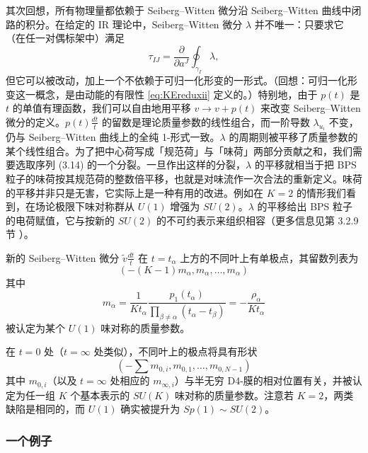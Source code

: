 其次回想，所有物理量都依赖于 Seiberg–Witten 微分沿 Seiberg–Witten 曲线中闭路的积分。在给定的 IR 理论中，Seiberg–Witten 微分 $\lambda$ 并不唯一：只要求它（在任一对偶标架中）满足
\begin{equation}
\label{eq:tau-from-period}
\tau_{IJ} = \frac{\partial}{\partial a^J} \oint_{\gamma_I} \lambda,
\end{equation}
但它可以被改动，加上一个不依赖于可归一化形变的一形式。（回想：可归一化形变这一概念，是由动能的有限性 \eqref{eq:KEreduxii} 定义的。）特别地，由于 $p(t)$ 是 $t$ 的单值有理函数，我们可以自由地用平移 $v \to v + p(t)$ 来改变 Seiberg–Witten 微分的定义。$p(t) \frac{dt}{t}$ 的留数是理论质量参数的线性组合，而一阶导数 $\lambda_{u_i}$ 不变，仍与 Seiberg–Witten 曲线上的全纯 1-形式一致。$\lambda$ 的周期则被平移了质量参数的某个线性组合。为了把中心荷写成「规范荷」与「味荷」两部分贡献之和，我们需要选取序列 (3.14)%
的一个分裂。一旦作出这样的分裂，$\lambda$ 的平移就相当于把 BPS 粒子的味荷按其规范荷的整数倍平移，也就是对味流作一次合法的重新定义。味荷的平移并非只是无害，它实际上是一种有用的改进。例如在 $K=2$ 的情形我们看到，在场论极限下味对称群从 $U(1)$ 增强为 $SU(2)$。$\lambda$ 的平移给出 BPS 粒子的电荷赋值，它与按新的 $SU(2)$ 的不可约表示来组织相容（更多信息见第 3.2.9 节%
）。

新的 Seiberg–Witten 微分 $\tilde v \frac{dt}{t}$ 在 $t=t_\alpha$ 上方的不同叶上有单极点，其留数列表为
\begin{equation}
\label{eq:residues-malpha}
\left( - (K-1) m_\alpha, m_\alpha, \dots, m_\alpha \right)
\end{equation}
其中
\begin{equation}\label{eq:def-m-alpha}
m_\alpha = \frac{1}{K t_\alpha} \frac{p_1(t_\alpha)}{\prod_{\beta \not=\alpha}
(t_\alpha -t_\beta)}= - \frac{\rho_\alpha}{K t_\alpha}
\end{equation}
被认定为某个 $U(1)$ 味对称的质量参数。

在 $t=0$ 处（$t=\infty$ 处类似），不同叶上的极点将具有形状
\begin{equation}
\label{eq:residues-m0}
\left( - \sum m_{0,i}, m_{0,1}, \dots, m_{0,N-1} \right)
\end{equation}
其中 $m_{0,i}$（以及 $t=\infty$ 处相应的 $m_{\infty,i}$）与半无穷 D4-膜的相对位置有关，并被认定为任一组 $K$ 个基本表示的 $SU(K)$ 味对称的质量参数。注意若 $K=2$，两类缺陷是相同的，而 $U(1)$ 确实被提升为 $Sp(1) \sim SU(2)$。

\subsubsection*{一个例子}


